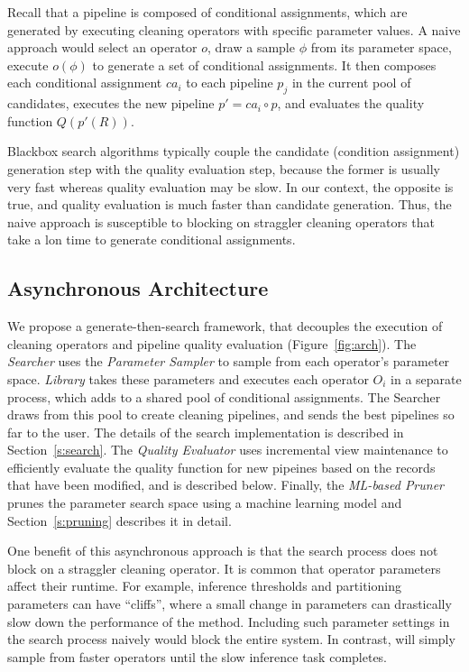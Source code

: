 Recall that a pipeline is composed of conditional assignments, which are generated by executing cleaning operators with specific parameter values.   A naive approach would select an operator $o$, draw a sample $\phi$ from its parameter space, execute $o(\phi)$ to generate a set of conditional assignments.      It then composes each conditional assignment $ca_i$ to each pipeline $p_j$ in the current pool of candidates, executes the new pipeline $p' = ca_i \circ p$, and evaluates the quality function $Q(p'(R))$.

Blackbox search algorithms typically couple the candidate (condition assignment) generation step with the quality evaluation step, because the former is usually very fast whereas quality evaluation may be slow.  In our context, the opposite is true, and quality evaluation is much faster than candidate generation.   Thus, the naive approach is susceptible to blocking on straggler cleaning operators that take a lon time to generate conditional assignments. 

\subsection{Asynchronous Architecture}

We propose a generate-then-search framework, that decouples the execution of cleaning operators and pipeline quality evaluation (Figure~\ref{fig:arch}).  The {\it Searcher} uses the {\it Parameter Sampler} to sample from each operator's parameter space.  {\it Library} takes these parameters and executes each operator $O_i$ in a separate process, which adds to a shared pool of conditional assignments.  The Searcher draws from this pool to create cleaning pipelines, and sends the best pipelines so far to the user.  The details of the search implementation is described in Section~\ref{s:search}.   The {\it Quality Evaluator} uses incremental view maintenance to efficiently evaluate the quality function for new pipeines based on the records that have been modified, and is described below.  Finally, the {\it ML-based Pruner} prunes the parameter search space using a machine learning model and  Section~\ref{s:pruning} describes it in detail.

One benefit of this asynchronous approach is that the search process does not block on a straggler cleaning operator.  It is common that operator parameters affect their runtime.  For example, inference thresholds and partitioning parameters can have ``cliffs'', where a small change in parameters can drastically slow down the performance of the method. Including such parameter settings in the search process naively would block the entire system.  In contrast, \sys will simply sample from faster operators until the slow inference task completes.  

